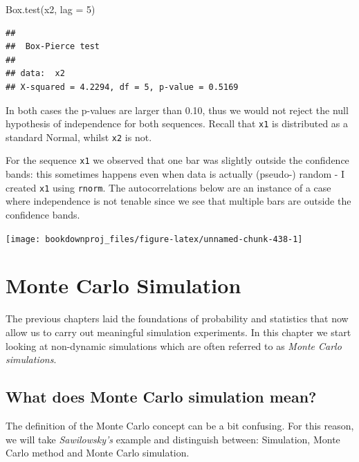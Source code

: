 \documentclass[
]{book}
\newenvironment{Shaded}{\begin{snugshade}}{\end{snugshade}}
\newcommand{\AttributeTok}[1]{\textcolor[rgb]{0.77,0.63,0.00}{#1}}
\newcommand{\DecValTok}[1]{\textcolor[rgb]{0.00,0.00,0.81}{#1}}
\newcommand{\FunctionTok}[1]{\textcolor[rgb]{0.00,0.00,0.00}{#1}}
\newcommand{\NormalTok}[1]{#1}
\theoremstyle{definition}
\theoremstyle{definition}
\theoremstyle{definition}
\theoremstyle{definition}
\theoremstyle{remark}
\begin{document}
\begin{Shaded}
\begin{Highlighting}[]
\FunctionTok{Box.test}\NormalTok{(x2, }\AttributeTok{lag =} \DecValTok{5}\NormalTok{)}
\end{Highlighting}
\end{Shaded}

\begin{verbatim}
## 
##  Box-Pierce test
## 
## data:  x2
## X-squared = 4.2294, df = 5, p-value = 0.5169
\end{verbatim}

In both cases the p-values are larger than 0.10, thus we would not reject the null hypothesis of independence for both sequences. Recall that \texttt{x1} is distributed as a standard Normal, whilst \texttt{x2} is not.

For the sequence \texttt{x1} we observed that one bar was slightly outside the confidence bands: this sometimes happens even when data is actually (pseudo-) random - I created \texttt{x1} using \texttt{rnorm}. The autocorrelations below are an instance of a case where independence is not tenable since we see that multiple bars are outside the confidence bands.

\begin{center}\texttt{[image: bookdownproj\_files/figure-latex/unnamed-chunk-438-1]} \end{center}

\hypertarget{monte-carlo-simulation}{%
\chapter{Monte Carlo Simulation}\label{monte-carlo-simulation}}

The previous chapters laid the foundations of probability and statistics that now allow us to carry out meaningful simulation experiments. In this chapter we start looking at non-dynamic simulations which are often referred to as \emph{Monte Carlo simulations}.

\hypertarget{what-does-monte-carlo-simulation-mean}{%
\section{What does Monte Carlo simulation mean?}\label{what-does-monte-carlo-simulation-mean}}

The definition of the Monte Carlo concept can be a bit confusing. For this reason, we will take \emph{Sawilowsky's} example and distinguish between: Simulation, Monte Carlo method and Monte Carlo simulation.
\end{document}
